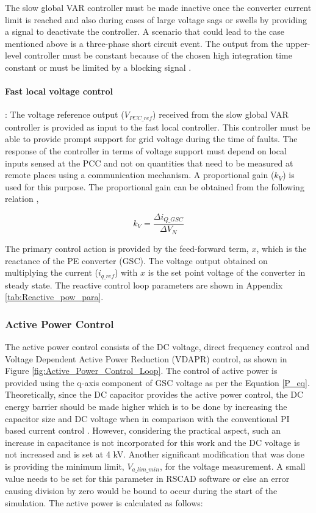 The slow global VAR controller must be made inactive once the converter current limit is reached and also during cases of large voltage sags or swells by providing a signal to deactivate the controller. A scenario that could lead to the case mentioned above is a three-phase short circuit event. The output from the upper-level controller must be constant because of the chosen high integration time constant or must be limited by a blocking signal \cite{korai_dynamic_2019}.

\paragraph{Fast local voltage control}:
The voltage reference output ($V_{PCC\_ref}$) received from the slow global VAR controller is provided as input to the fast local controller. This controller must be able to provide prompt support for grid voltage during the time of faults. The response of the controller in terms of voltage support must depend on local inputs sensed at the \gls{PCC} and not on quantities that need to be measured at remote places using a communication mechanism. A proportional gain ($k_V$) is used for this purpose. The proportional gain can be obtained from the following relation \cite{korai_dynamic_2019},

\begin{equation}
    k_V = \frac{\Delta i_{Q\_GSC}}{\Delta V_N }
\end{equation}

The primary control action is provided by the feed-forward term, $x$, which is the reactance of the \gls{PE} converter (\gls{GSC}). The voltage output obtained on multiplying the current ($i_{q\_ref}$) with $x$ is the set point voltage of the converter in steady state. The reactive control loop parameters are shown in Appendix \ref{tab:Reactive_pow_para}.

\subsubsection{Active Power Control}\label{Active_power_DVC_theory}
The active power control consists of the \gls{DC} voltage, direct frequency control and Voltage Dependent Active Power Reduction (\gls{VDAPR}) control, as shown in Figure \ref{fig:Active_Power_Control_Loop}. The control of active power is provided using the q-axis component of \gls{GSC} voltage as per the Equation \ref{P_eq}. Theoretically, since the \gls{DC} capacitor provides the active power control, the \gls{DC} energy barrier should be made higher which is to be done by increasing the capacitor size and \gls{DC} voltage when in comparison with the conventional \gls{PI} based current control \cite{korai_dynamic_2019}. However, considering the practical aspect, such an increase in capacitance is not incorporated for this work and the \gls{DC} voltage is not increased and is set at 4 kV. Another significant modification that was done is providing the minimum limit, $V_{a\_lim\_min}$, for the voltage measurement. A small value needs to be set for this parameter in RSCAD software or else an error causing division by zero would be bound to occur during the start of the simulation. The active power is calculated as follows: 


